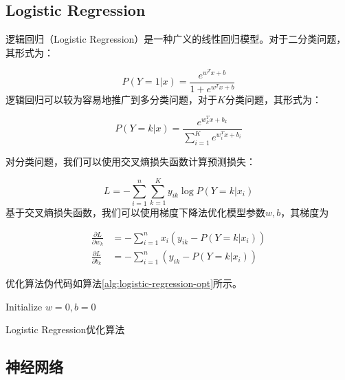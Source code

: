 \documentclass{article}
\begin{document}
\subsection{Logistic Regression}

逻辑回归（Logistic Regression）是一种广义的线性回归模型。对于二分类问题，其形式为：

\begin{equation}
P(Y=1|x) = \frac{e^{w^Tx+b}}{1+e^{w^Tx+b}}
\label{eq:logistic-regression}
\end{equation}
逻辑回归可以较为容易地推广到多分类问题，对于$K$分类问题，其形式为：

\begin{equation}
P(Y=k|x) = \frac{e^{w_k^Tx+b_k}}{\sum_{i=1}^K e^{w_i^Tx+b_i}}
\label{eq:logistic-regression-multi}
\end{equation}

对分类问题，我们可以使用交叉熵损失函数计算预测损失：

\begin{equation}
L = -\sum_{i=1}^n \sum_{k=1}^K y_{ik}\log P(Y=k|x_i)
\label{eq:cross-entropy}
\end{equation}
基于交叉熵损失函数，我们可以使用梯度下降法优化模型参数$w,b$，其梯度为

\begin{equation}
\begin{aligned}
\frac{\partial L}{\partial w_k} &= -\sum_{i=1}^n x_i(y_{ik}-P(Y=k|x_i)) \\
\frac{\partial L}{\partial b_k} &= -\sum_{i=1}^n (y_{ik}-P(Y=k|x_i))
\end{aligned}
\label{eq:cross-entropy-gradient}
\end{equation}

优化算法伪代码如算法\ref{alg:logistic-regression-opt}所示。

\begin{algorithm}[]
    \label{alg:logistic-regression-opt}
    \DontPrintSemicolon
    \SetAlgoLined
    Initialize $w=0,b=0$\;
    \caption{Logistic Regression优化算法}
\end{algorithm}

\subsection{神经网络}
\end{document}
